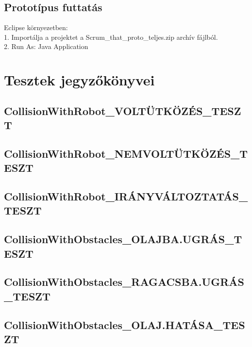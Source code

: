 \subsection{Prototípus futtatás}
Eclipse környezetben:\\
1. Importálja a projektet a Scrum\_that\_proto\_teljes.zip archív fájlból.\\
2. Run As: Java Application

\section{Tesztek jegyzőkönyvei}

\subsection{CollisionWithRobot\_VOLTÜTKÖZÉS\_TESZT}


\subsection{CollisionWithRobot\_NEMVOLTÜTKÖZÉS\_TESZT}


\subsection{CollisionWithRobot\_IRÁNYVÁLTOZTATÁS\_TESZT}


\subsection{CollisionWithObstacles\_OLAJBA.UGRÁS\_TESZT }


\subsection{CollisionWithObstacles\_RAGACSBA.UGRÁS\_TESZT}


\subsection{ CollisionWithObstacles\_OLAJ.HATÁSA\_TESZT}

